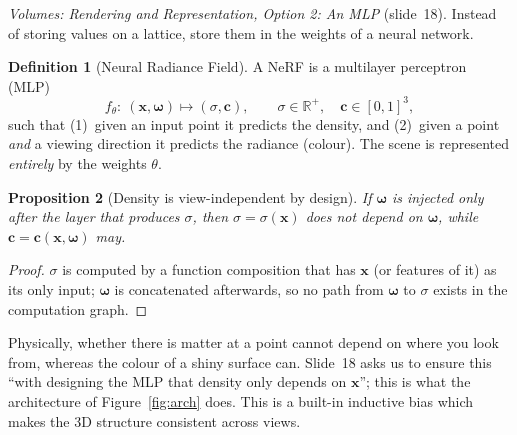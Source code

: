 \documentclass[11pt,a4paper]{article}
\newcommand{\R}{\mathbb{R}}
\newcommand{\om}{\boldsymbol{\omega}}
\newcommand{\cc}{\boldsymbol{c}}
\newcommand{\xx}{\boldsymbol{x}}
\theoremstyle{definition}
\newtheorem{definition}{Definition}[section]
\theoremstyle{plain}
\newtheorem{proposition}[definition]{Proposition}
\theoremstyle{remark}
\begin{document}
\emph{Volumes: Rendering and Representation, Option 2: An MLP} (slide~18). Instead of storing values on a lattice, store them in the weights of a neural network.

\begin{definition}[Neural Radiance Field]\label{def:nerf}
A NeRF is a multilayer perceptron (MLP)
\[
f_\theta:\ (\xx,\om)\longmapsto(\sigma,\cc),\qquad \sigma\in\R^+,\quad\cc\in[0,1]^3 ,
\]
such that (1)~given an input point it predicts the density, and (2)~given a point \emph{and} a viewing direction it predicts the radiance (colour). The scene is represented \emph{entirely} by the weights $\theta$.
\end{definition}

\begin{proposition}[Density is view-independent by design]\label{prop:viewindep}
If $\om$ is injected only after the layer that produces $\sigma$, then $\sigma=\sigma(\xx)$ does not depend on $\om$, while $\cc=\cc(\xx,\om)$ may.
\end{proposition}
\begin{proof}
$\sigma$ is computed by a function composition that has $\xx$ (or features of it) as its only input; $\om$ is concatenated afterwards, so no path from $\om$ to $\sigma$ exists in the computation graph.
\end{proof}

\begin{intuition}
Physically, whether there is matter at a point cannot depend on where you look from, whereas the colour of a shiny surface can. Slide~18 asks us to ensure this ``with designing the MLP that density only depends on $\xx$''; this is what the architecture of Figure~\ref{fig:arch} does. This is a built-in inductive bias which makes the 3D structure consistent across views.
\end{intuition}
\end{document}

